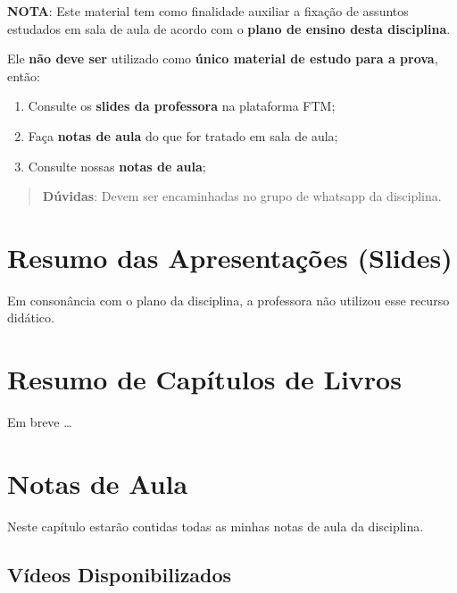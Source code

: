 \documentclass[
]{book}
\providecommand{\tightlist}{%
  \setlength{\itemsep}{0pt}\setlength{\parskip}{0pt}}
\begin{document}
\textbf{NOTA}: Este material tem como finalidade auxiliar a fixação de assuntos estudados em sala de aula de acordo com o \textbf{plano de ensino desta disciplina}.

Ele \textbf{não deve ser} utilizado como \textbf{único material de estudo para a prova}, então:

\begin{enumerate}
\def\labelenumi{\arabic{enumi}.}
\tightlist
\item
  Consulte os \textbf{slides da professora} na plataforma FTM;\\
\item
  Faça \textbf{notas de aula} do que for tratado em sala de aula;\\
\item
  Consulte nossas \textbf{notas de aula};
\end{enumerate}

\begin{quote}
\textbf{Dúvidas}: Devem ser encaminhadas no grupo de whatsapp da disciplina.
\end{quote}

\hypertarget{resumo-das-apresentauxe7uxf5es-slides}{%
\chapter{Resumo das Apresentações (Slides)}\label{resumo-das-apresentauxe7uxf5es-slides}}

Em consonância com o plano da disciplina, a professora não utilizou esse recurso didático.

\hypertarget{resumo-de-capuxedtulos-de-livros}{%
\chapter{Resumo de Capítulos de Livros}\label{resumo-de-capuxedtulos-de-livros}}

Em breve \ldots{}

\hypertarget{notas-de-aula}{%
\chapter{Notas de Aula}\label{notas-de-aula}}

Neste capítulo estarão contidas todas as minhas notas de aula da disciplina.

\hypertarget{vuxeddeos-disponibilizados}{%
\section{Vídeos Disponibilizados}\label{vuxeddeos-disponibilizados}}
\end{document}
